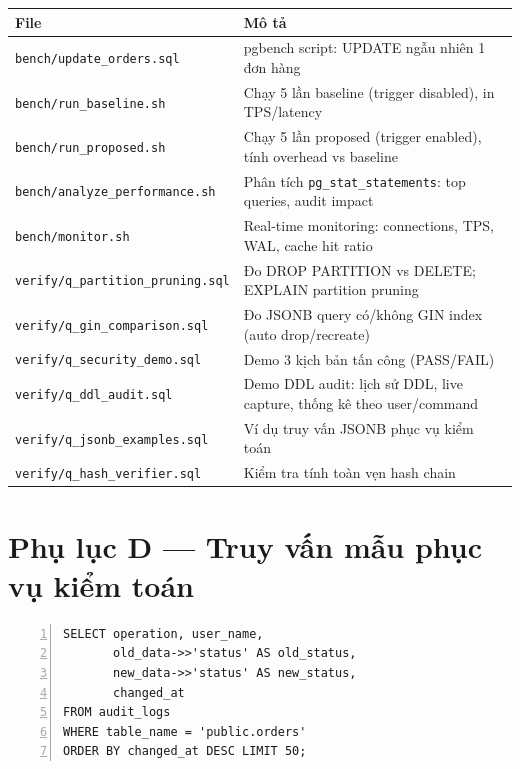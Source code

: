 \begin{center}
\label{tab:benchmark-scripts}
\begin{tabularx}{\textwidth}{lX}
\toprule
\textbf{File} & \textbf{Mô tả} \\
\midrule
\texttt{bench/update\_orders.sql} & pgbench script: UPDATE ngẫu nhiên 1 đơn hàng \\
\texttt{bench/run\_baseline.sh} & Chạy 5 lần baseline (trigger disabled), in TPS/latency \\
\texttt{bench/run\_proposed.sh} & Chạy 5 lần proposed (trigger enabled), tính overhead vs baseline \\
\texttt{bench/analyze\_performance.sh} & Phân tích \texttt{pg\_stat\_statements}: top queries, audit impact \\
\texttt{bench/monitor.sh} & Real-time monitoring: connections, TPS, WAL, cache hit ratio \\
\texttt{verify/q\_partition\_pruning.sql} & Đo DROP PARTITION vs DELETE; EXPLAIN partition pruning \\
\texttt{verify/q\_gin\_comparison.sql} & Đo JSONB query có/không GIN index (auto drop/recreate) \\
\texttt{verify/q\_security\_demo.sql} & Demo 3 kịch bản tấn công (PASS/FAIL) \\
\texttt{verify/q\_ddl\_audit.sql} & Demo DDL audit: lịch sử DDL, live capture, thống kê theo user/command \\
\texttt{verify/q\_jsonb\_examples.sql} & Ví dụ truy vấn JSONB phục vụ kiểm toán \\
\texttt{verify/q\_hash\_verifier.sql} & Kiểm tra tính toàn vẹn hash chain \\
\bottomrule
\end{tabularx}
\end{center}

\section*{Phụ lục D --- Truy vấn mẫu phục vụ kiểm toán}

\begin{center}
\label{lst:query-d1}
\begin{Verbatim}[frame=single, fontsize=\footnotesize, numbers=left, numbersep=5pt, breaklines]
SELECT operation, user_name,
       old_data->>'status' AS old_status,
       new_data->>'status' AS new_status,
       changed_at
FROM audit_logs
WHERE table_name = 'public.orders'
ORDER BY changed_at DESC LIMIT 50;
\end{Verbatim}
\end{center}

